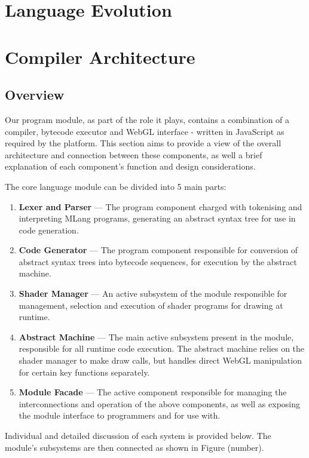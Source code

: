 \documentclass{l3proj}
\begin{document}
\chapter{Language Evolution}
\label{evo}

\chapter{Compiler Architecture}
\label{arch}

\section{Overview}
\label{arch-over}

Our program module, as part of the role it plays, contains a combination of a compiler, bytecode executor and WebGL interface - written in JavaScript as required by the platform. This section aims to provide a view of the overall architecture and connection between these components, as well a brief explanation of each component's function and design considerations.

The core language module can be divided into 5 main parts:
\begin{enumerate}
\item \textbf{Lexer and Parser} --- The program component charged with tokenising and interpreting MLang programs, generating an abstract syntax tree for use in code generation.
\item \textbf{Code Generator} --- The program component responsible for conversion of abstract syntax trees into bytecode sequences, for execution by the abstract machine.
\item \textbf{Shader Manager} --- An active subsystem of the module responsible for management, selection and execution of shader programs for drawing at runtime.
\item \textbf{Abstract Machine} --- The main active subsystem present in the module, responsible for all runtime code execution. The abstract machine relies on the shader manager to make draw calls, but handles direct WebGL manipulation for certain key functions separately.
\item \textbf{Module Facade} --- The active component responsible for managing the interconnections and operation of the above components, as well as exposing the module interface to programmers and for use with.
\end{enumerate}
Individual and detailed discussion of each system is provided below. The module's subsystems are then connected as shown in Figure (number).
\end{document}
